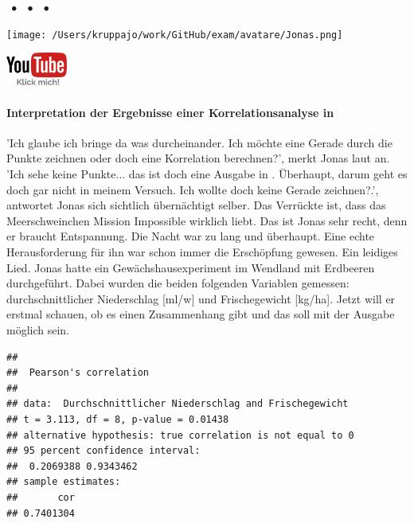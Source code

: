 \documentclass[a4paper, 9pt]{scrartcl}\usepackage[]{graphicx}\usepackage[]{xcolor}
\makeatletter
\newenvironment{kframe}{%
 \def\at@end@of@kframe{}%
 \ifinner\ifhmode%
  \def\at@end@of@kframe{\end{minipage}}%
  \begin{minipage}{\columnwidth}%
 \fi\fi%
 \def\FrameCommand##1{\hskip\@totalleftmargin \hskip-\fboxsep
 \colorbox{shadecolor}{##1}\hskip-\fboxsep
     \hskip-\linewidth \hskip-\@totalleftmargin \hskip\columnwidth}%
 \MakeFramed {\advance\hsize-\width
   \@totalleftmargin\z@ \linewidth\hsize
   \@setminipage}}%
 {\par\unskip\endMakeFramed%
 \at@end@of@kframe}
\newenvironment{knitrout}{}{} %
\makeatother
\begin{document}
 
\ifcollection
\begin{flushright}
\tiny\vspace{-3Ex}
\textbf{\examinhaltstart}
\exammodulestat $\;\bullet$
\exammodulestatbbv $\;\bullet$
\exammodulestatversuch $\;\bullet$
\exammodulebiostat
\vspace{-4Ex}
\end{flushright}
\begin{minipage}[t]{0.5\textwidth}
\texttt{[image: /Users/kruppajo/work/GitHub/exam/avatare/Jonas.png]}
\end{minipage}
\begin{minipage}[t]{0.5\textwidth}
\hfill
\href{https://youtu.be/C9skfFRTHhI}{\includegraphics[width = 2cm]{img/youtube}}
\end{minipage}
\vspace{-3ex}
\fi



\ifcollection
\paragraph{Interpretation der Ergebnisse einer Korrelationsanalyse in \Rlogo}
\fi

'Ich glaube ich bringe da was durcheinander. Ich möchte eine Gerade durch die Punkte zeichnen oder doch eine Korrelation berechnen?', merkt Jonas laut an. 'Ich sehe keine Punkte... das ist doch eine Ausgabe in \Rlogo. Überhaupt, darum geht es doch gar nicht in meinem Versuch. Ich wollte doch keine Gerade zeichnen?.', antwortet Jonas sich sichtlich übernächtigt selber. Das Verrückte ist, dass das Meerschweinchen Mission Impossible wirklich liebt. Das ist Jonas sehr recht, denn er braucht Entspannung. Die Nacht war zu lang und überhaupt. Eine echte Herausforderung für ihn war schon immer die Erschöpfung gewesen. Ein leidiges Lied. Jonas hatte ein Gewächshausexperiment im Wendland mit Erdbeeren durchgeführt. Dabei wurden die beiden folgenden Variablen gemessen: durchschnittlicher Niederschlag [ml/w] und Frischegewicht [kg/ha]. Jetzt will er erstmal schauen, ob es einen Zusammenhang gibt und das soll mit der \Rlogo Ausgabe möglich sein.


\begin{knitrout}
\color{fgcolor}\begin{kframe}
\begin{verbatim}
## 
## 	Pearson's correlation
## 
## data:  Durchschnittlicher Niederschlag and Frischegewicht
## t = 3.113, df = 8, p-value = 0.01438
## alternative hypothesis: true correlation is not equal to 0
## 95 percent confidence interval:
##  0.2069388 0.9343462
## sample estimates:
##       cor 
## 0.7401304
\end{verbatim}
\end{kframe}
\end{knitrout}
\end{document}
